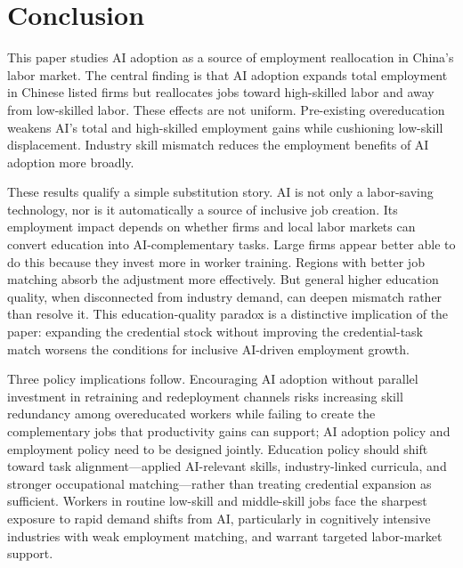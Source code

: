 \documentclass[12pt,a4paper]{article}
\theoremstyle{predstyle}
\theoremstyle{plain}
\begin{document}
\section{Conclusion}
\label{sec:concl}

This paper studies AI adoption as a source of employment reallocation in China's labor market. The central finding is that AI adoption expands total employment in Chinese listed firms but reallocates jobs toward high-skilled labor and away from low-skilled labor. These effects are not uniform. Pre-existing overeducation weakens AI's total and high-skilled employment gains while cushioning low-skill displacement. Industry skill mismatch reduces the employment benefits of AI adoption more broadly.

These results qualify a simple substitution story. AI is not only a labor-saving technology, nor is it automatically a source of inclusive job creation. Its employment impact depends on whether firms and local labor markets can convert education into AI-complementary tasks. Large firms appear better able to do this because they invest more in worker training. Regions with better job matching absorb the adjustment more effectively. But general higher education quality, when disconnected from industry demand, can deepen mismatch rather than resolve it. This education-quality paradox is a distinctive implication of the paper: expanding the credential stock without improving the credential-task match worsens the conditions for inclusive AI-driven employment growth.

Three policy implications follow. Encouraging AI adoption without parallel investment in retraining and redeployment channels risks increasing skill redundancy among overeducated workers while failing to create the complementary jobs that productivity gains can support; AI adoption policy and employment policy need to be designed jointly. Education policy should shift toward task alignment---applied AI-relevant skills, industry-linked curricula, and stronger occupational matching---rather than treating credential expansion as sufficient. Workers in routine low-skill and middle-skill jobs face the sharpest exposure to rapid demand shifts from AI, particularly in cognitively intensive industries with weak employment matching, and warrant targeted labor-market support.
\end{document}
